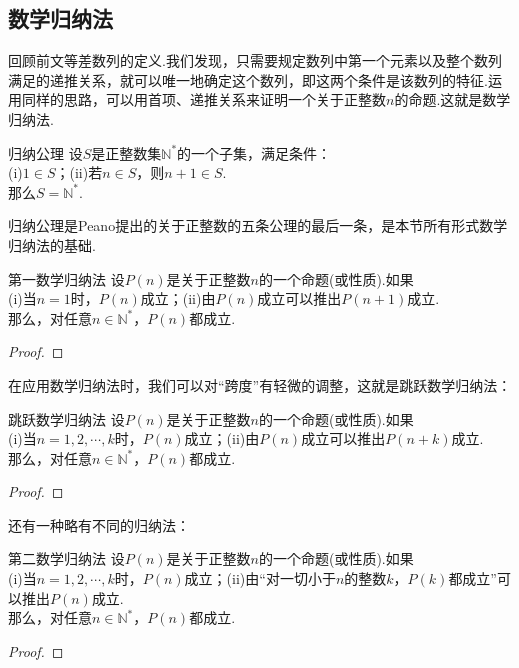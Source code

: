 \documentclass[lang=cn, zihao=5]{elegantbook}
\begin{document}
\subsection{数学归纳法}

回顾前文等差数列的定义.我们发现，只需要规定数列中第一个元素以及整个数列满足的递推关系，就可以唯一地确定这个数列，即这两个条件是该数列的特征.运用同样的思路，可以用首项、递推关系来证明一个关于正整数$n$的命题.这就是数学归纳法.

\begin{axiom}{归纳公理}
	设$S$是正整数集$\mathbb{N}^{*}$的一个子集，满足条件： \\
	(i)$1 \in S$；(ii)若$n \in S$，则$n+1 \in S$. \\
	那么$S = \mathbb{N}^{*}$.
\end{axiom}
\begin{remark}
	归纳公理是Peano提出的关于正整数的五条公理的最后一条，是本节所有形式数学归纳法的基础.
\end{remark}

\begin{theorem}{第一数学归纳法}
	设$P(n)$是关于正整数$n$的一个命题(或性质).如果 \\
	(i)当$n=1$时，$P(n)$成立；(ii)由$P(n)$成立可以推出$P(n+1)$成立. \\
	那么，对任意$n \in \mathbb{N}^{*}$，$P(n)$都成立.
\end{theorem}
\begin{proof}
\end{proof}

在应用数学归纳法时，我们可以对“跨度”有轻微的调整，这就是跳跃数学归纳法：

\begin{corollary}{跳跃数学归纳法}
	设$P(n)$是关于正整数$n$的一个命题(或性质).如果 \\
	(i)当$n=1,2, \cdots ,k$时，$P(n)$成立；(ii)由$P(n)$成立可以推出$P(n+k)$成立. \\
	那么，对任意$n \in \mathbb{N}^{*}$，$P(n)$都成立.
\end{corollary}
\begin{proof}
\end{proof}

还有一种略有不同的归纳法：

\begin{theorem}{第二数学归纳法}
	设$P(n)$是关于正整数$n$的一个命题(或性质).如果 \\
	(i)当$n=1,2, \cdots ,k$时，$P(n)$成立；(ii)由“对一切小于$n$的整数$k$，$P(k)$都成立”可以推出$P(n)$成立. \\
	那么，对任意$n \in \mathbb{N}^{*}$，$P(n)$都成立.
\end{theorem}
\begin{proof}
\end{proof}
\end{document}
